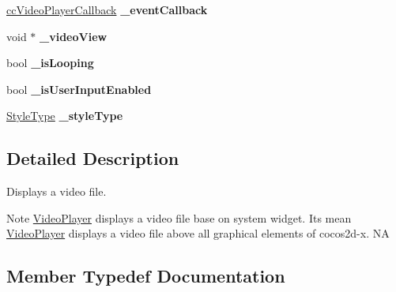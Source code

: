 \begin{DoxyCompactItemize}
\item 
\mbox{\label{classexperimental_1_1ui_1_1VideoPlayer_a20f6363c9bee7fff6c40466b830fc2a7}} 
\hyperlink{classexperimental_1_1ui_1_1VideoPlayer_a64ebf250429fec0efea303b13cecf02e}{cc\+Video\+Player\+Callback} {\bfseries \+\_\+event\+Callback}
\item 
\mbox{\label{classexperimental_1_1ui_1_1VideoPlayer_a3b4de5836fcfa2f93adeb3687f68de02}} 
void $\ast$ {\bfseries \+\_\+video\+View}
\item 
\mbox{\label{classexperimental_1_1ui_1_1VideoPlayer_aaafbeee4ef095d9c0a5661c178dcfbdf}} 
bool {\bfseries \+\_\+is\+Looping}
\item 
\mbox{\label{classexperimental_1_1ui_1_1VideoPlayer_a6afe5adc4d6e8b30a5643e499c51a270}} 
bool {\bfseries \+\_\+is\+User\+Input\+Enabled}
\item 
\mbox{\label{classexperimental_1_1ui_1_1VideoPlayer_a1e4b7bc03975d580e6ee5756c179d163}} 
\hyperlink{classexperimental_1_1ui_1_1VideoPlayer_a65711269d4eca8fe125aeda2928a80ec}{Style\+Type} {\bfseries \+\_\+style\+Type}
\end{DoxyCompactItemize}


\subsection{Detailed Description}
Displays a video file. 

\begin{DoxyNote}{Note}
\hyperlink{classexperimental_1_1ui_1_1VideoPlayer}{Video\+Player} displays a video file base on system widget. It\textquotesingle{}s mean \hyperlink{classexperimental_1_1ui_1_1VideoPlayer}{Video\+Player} displays a video file above all graphical elements of cocos2d-\/x.  NA 
\end{DoxyNote}


\subsection{Member Typedef Documentation}
\mbox{\label{classexperimental_1_1ui_1_1VideoPlayer_a64ebf250429fec0efea303b13cecf02e}} 

